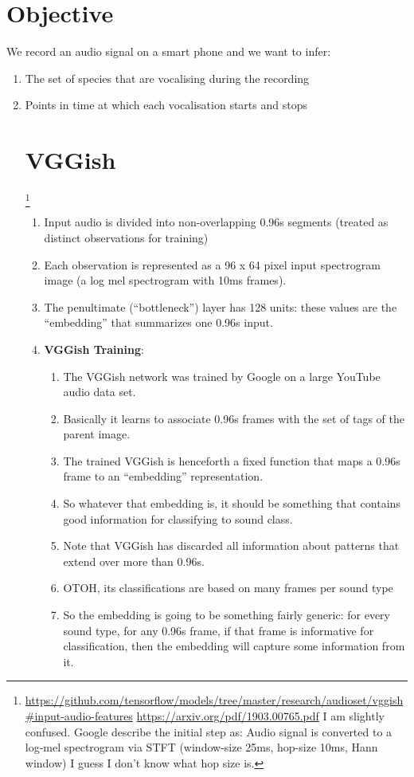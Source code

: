 \documentclass{article}
\begin{document}
\section{Objective}

We record an audio signal on a smart phone and we want to infer:
\begin{enumerate}
\item The set of species that are vocalising during the recording
\item Points in time at which each vocalisation starts and stops


\section{VGGish}
\footnote{
  \url{https://github.com/tensorflow/models/tree/master/research/audioset/vggish#input-audio-features}
  \url{https://arxiv.org/pdf/1903.00765.pdf} I am slightly confused.
  Google describe the initial step as: Audio signal is converted to a log-mel spectrogram via STFT (window-size 25ms, hop-size 10ms, Hann window) I guess I don't know what hop size is.
}
\begin{enumerate}
\item Input audio is divided into non-overlapping 0.96s segments (treated as distinct observations for training)
\item Each observation is represented as a 96 x 64 pixel input spectrogram image (a log mel spectrogram with 10ms frames).
\item The penultimate (``bottleneck'') layer has 128 units: these values are the ``embedding'' that summarizes one 0.96s input.

\item {\bf VGGish Training}:
  \begin{enumerate}
  \item The VGGish network was trained by Google on a large YouTube audio data set.
  \item Basically it learns to associate 0.96s frames with the set of tags of the parent image.
  \item The trained VGGish is henceforth a fixed function that maps a 0.96s frame to an ``embedding''
    representation.
  \item So whatever that embedding is, it should be something that contains good information for classifying to
    sound class.
  \item Note that VGGish has discarded all information about patterns that extend over more than 0.96s.
  \item OTOH, its classifications are based on many frames per sound type
  \item So the embedding is going to be something fairly generic: for every sound type, for any 0.96s frame, if
    that frame is informative for classification, then the embedding will capture some information from it.
  \end{enumerate}


\end{enumerate}
\end{enumerate}
\end{document}
